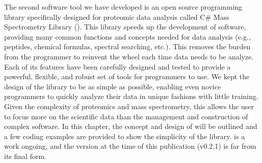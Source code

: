 The second software tool we have developed is an open source programming library specifically designed for proteomic data analysis called C\# Mass Spectrometry Library (\csmsl{}). This library speeds up the development of software, providing many common functions and concepts needed for data analysis (e.g., peptides, chemical formulas, spectral searching, etc.). This removes the burden from the programmer to reinvent the wheel each time data needs to be analyze. Each of its features have been carefully designed and tested to provide a powerful, flexible, and robust set of tools for programmers to use. We kept the design of the library to be as simple as possible, enabling even novice programmers to quickly analyze their data in unique fashions with little training. Given the complexity of proteomics and mass spectrometry, this allows the user to focus more on the scientific data than the management and construction of complex software. In this chapter, the concept and design of \csmsl{} will be outlined and a few coding examples are provided to show the simplicity of the library. \csmsl{} is a work ongoing, and the version at the time of this publication (v0.2.1) is far from its final form. 

